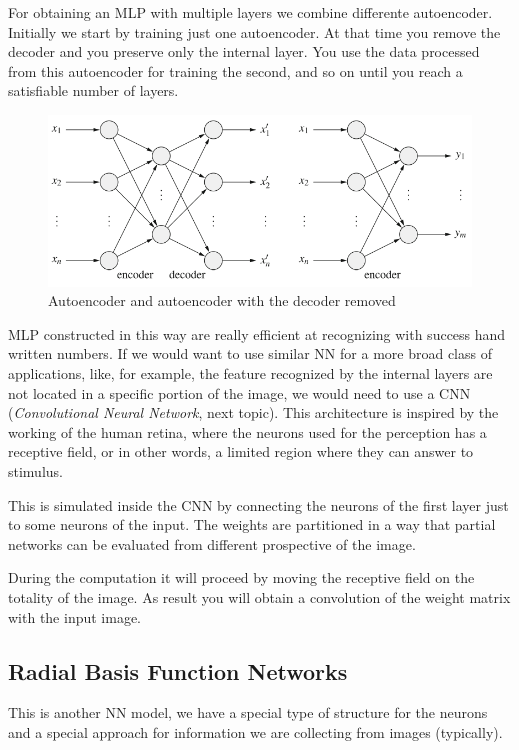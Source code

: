 \documentclass{article}
\begin{document}
For obtaining an MLP with multiple layers we combine differente autoencoder. Initially we start by
training just one autoencoder. At that time you remove the decoder and you preserve only the internal layer.
You use the data processed from this autoencoder for training the second, and so on until you
reach a satisfiable number of layers.
\begin{figure}
    \centering
    \includegraphics[scale=0.5]{images/autoencoder_decoder.png}
    \caption{Autoencoder and autoencoder with the decoder removed}
\end{figure}
MLP constructed in this way are really efficient at recognizing with success hand written numbers. If
we would want to use similar NN for a more broad class of applications, like, for example, the
feature recognized by the internal layers are not located in a specific portion of the image, we would
need to use a CNN (\textit{Convolutional Neural Network}, next topic). This architecture is inspired
by the working of the human retina, where the neurons used for the perception has a receptive field,
or in other words, a limited region where they can answer to stimulus.

This is simulated inside the CNN by connecting the neurons of the first layer just to some neurons
of the input. The weights are partitioned in a way that partial networks can be evaluated  from
different prospective of the image.

During the computation it will proceed by moving the receptive field on the totality of the image. As
result you will obtain a convolution of the weight matrix with the input image.

\subsection{Radial Basis Function Networks}
This is another NN model, we have a special type of structure for the neurons and a special approach
for information we are collecting from images (typically).
\end{document}
